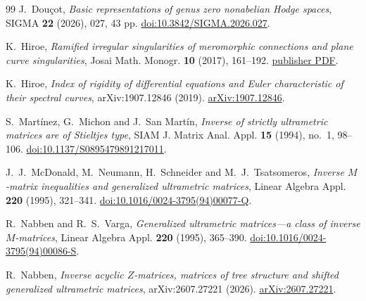 \documentclass[11pt,a4paper]{amsart}
\theoremstyle{plain}
\theoremstyle{definition}
\begin{document}
\begin{thebibliography}{99}
J.~Dou\c cot,
\emph{Basic representations of genus zero nonabelian Hodge spaces},
SIGMA \textbf{22} (2026), 027, 43 pp.
\href{https://doi.org/10.3842/SIGMA.2026.027}{doi:10.3842/SIGMA.2026.027}.

K.~Hiroe,
\emph{Ramified irregular singularities of meromorphic connections and plane curve singularities},
Josai Math. Monogr. \textbf{10} (2017), 161--192.
\href{https://libir.josai.ac.jp/il/user_contents/02/G0000284repository/pdf/JOS-13447777-1011.pdf}{publisher PDF}.

K.~Hiroe,
\emph{Index of rigidity of differential equations and Euler characteristic of their spectral
curves},
arXiv:1907.12846 (2019).
\href{https://arxiv.org/abs/1907.12846}{arXiv:1907.12846}.

S.~Mart\'{i}nez, G.~Michon and J.~San Mart\'{i}n,
\emph{Inverse of strictly ultrametric matrices are of Stieltjes type},
SIAM J. Matrix Anal. Appl. \textbf{15} (1994), no.~1, 98--106.
\href{https://doi.org/10.1137/S0895479891217011}{doi:10.1137/S0895479891217011}.

J.~J.~McDonald, M.~Neumann, H.~Schneider and M.~J.~Tsatsomeros,
\emph{Inverse $M$-matrix inequalities and generalized ultrametric matrices},
Linear Algebra Appl. \textbf{220} (1995), 321--341.
\href{https://doi.org/10.1016/0024-3795(94)00077-Q}{doi:10.1016/0024-3795(94)00077-Q}.

R.~Nabben and R.~S.~Varga,
\emph{Generalized ultrametric matrices---a class of inverse $M$-matrices},
Linear Algebra Appl. \textbf{220} (1995), 365--390.
\href{https://doi.org/10.1016/0024-3795(94)00086-S}{doi:10.1016/0024-3795(94)00086-S}.

R.~Nabben,
\emph{Inverse acyclic $Z$-matrices, matrices of tree structure and shifted generalized
ultrametric matrices},
arXiv:2607.27221 (2026).
\href{https://arxiv.org/abs/2607.27221}{arXiv:2607.27221}.

\end{thebibliography}
\end{document}
